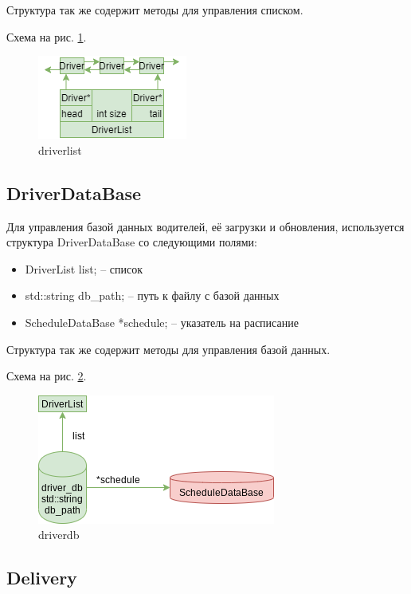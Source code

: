 Структура так же содержит методы для управления списком.

Схема на рис. \ref{driver_list}.

\begin{figure}[H]
    \centering
    \includegraphics[width=0.4\linewidth]{photo/data_structures/driver_list}
    \caption{driverlist}
    \label{driver_list}
\end{figure}

\subsection{DriverDataBase}

Для управления базой данных водителей, 
её загрузки и обновления, 
используется структура DriverDataBase со следующими полями: 

\begin{itemize}
    \item DriverList list{}; -- список
    \item std::string db\_path{}; -- путь к файлу с базой данных
    \item ScheduleDataBase *schedule{}; -- указатель на расписание
\end{itemize}

Структура так же содержит методы для управления базой данных.

Схема на рис. \ref{driver_db}.

\begin{figure}[hpt!]
    \centering
    \includegraphics[width=0.4\linewidth]{photo/data_structures/driver_db}
    \caption{driverdb}
    \label{driver_db}
\end{figure}

\subsection{Delivery}

